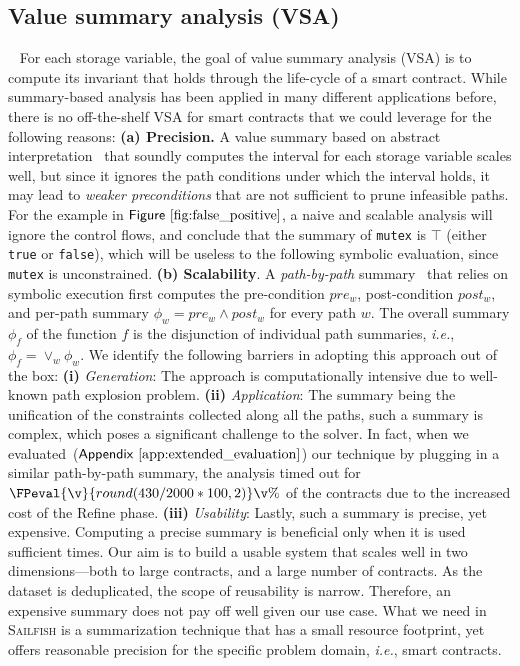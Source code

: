 \documentclass[conference, romanappendices]{tex/IEEEtran}
\theoremstyle{bfnote}
\newcommand{\toolname}{\textsc{Sailfish}\xspace}
\newcommand{\refine}{{\sc Refine}\xspace}
\newcommand{\smart}{smart contract}
\newcommand{\ie}{\textit{i.e.}}
\newcommand{\Fig}[1]{\ensuremath{\sf Figure~\ref{#1}}}
\newcommand{\Appen}[1]{\ensuremath{\sf Appendix~\ref{#1}}}
\newcommand{\clintSpeedupDataset}{2000}
\newcommand{\clintPathSummaryTimeout}{430}
\begin{document}
\subsection{\textbf{Value summary analysis (VSA)}}
~\label{sec:value-sum} 
For each storage variable, the goal of value summary analysis (VSA) is to compute
its invariant that holds through the life-cycle of a \smart.
While summary-based analysis has been applied in many different applications before, there is no off-the-shelf VSA for \smart s that we could leverage for the following reasons:
\textbf{(a) Precision.}
A value summary based on abstract interpretation~\cite{Pereira13} that soundly computes the interval for each storage variable scales well, but since it ignores the path conditions under which the interval holds, it may lead to \emph{weaker preconditions} that are not sufficient to prune infeasible paths.
For the example in \Fig{fig:false_positive}, a naive and scalable analysis will ignore the control flows, and conclude that the summary of \texttt{mutex} is $\top$ (either \texttt{true} or \texttt{false}), which will be useless to the following symbolic evaluation, since \texttt{mutex} is unconstrained.
\textbf{(b) Scalability}.
A \textit{path-by-path} summary~\cite{Godefroid07,AnandGT08} that relies on symbolic execution first computes the pre-condition $pre_w$, post-condition $post_w$, and per-path summary $\phi_w = pre_w \land post_w$ for every path $w$.
The overall summary $\phi_f$ of the function $f$ is the disjunction of individual path summaries, \ie, $\phi_f = \lor_w \phi_w$.
We identify the following barriers in adopting this approach out of the box:
\textbf{(i)} \textit{Generation}: The approach is computationally intensive due to well-known path explosion problem.
\textbf{(ii)} \textit{Application}: The summary being the unification of the constraints collected along all the paths, such a summary is complex, which poses a significant challenge to the solver.
In fact, when we evaluated~(\Appen{app:extended_evaluation}) our technique by plugging in a similar path-by-path summary, the analysis timed out for $\FPeval{\v}{round(\clintPathSummaryTimeout/\clintSpeedupDataset*100,2)}\v\%$ of the contracts due to the increased cost of the \refine phase.
\textbf{(iii)} \textit{Usability}: Lastly, such a summary is precise, yet expensive.
Computing a precise summary is beneficial only when it is used sufficient times.
Our aim is to build a usable system that scales well in two dimensions---both to large contracts, and a large number of contracts.
As the dataset is deduplicated, the scope of reusability is narrow. 
Therefore, an expensive summary does not pay off well given our use case.
What we need in \toolname is a summarization technique that has a small resource footprint, yet offers reasonable precision for the specific problem domain, \ie, \smart s.
\end{document}

